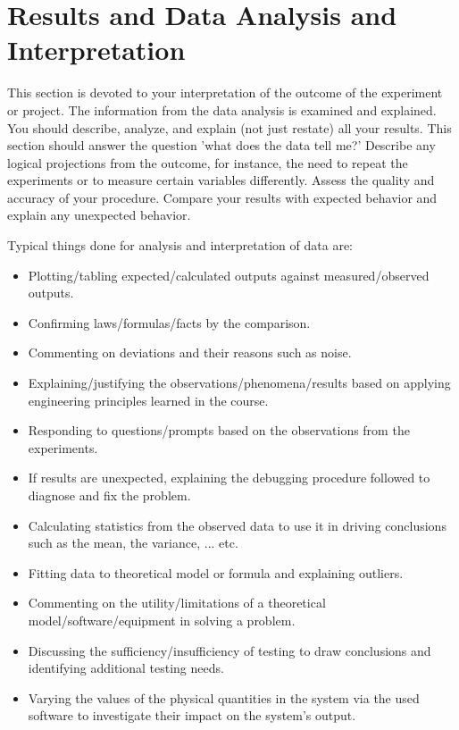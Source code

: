 \documentclass[journal]{IEEEtran}
\begin{document}
\section{Results and Data Analysis and Interpretation}
This section is devoted to your interpretation of the outcome of the experiment or project. The information from the data analysis is examined and explained. You should describe, analyze, and explain (not just restate) all your results. This section should answer the question 'what does the data tell me?' Describe any logical projections from the outcome, for instance, the need to repeat the experiments or to measure certain variables differently. Assess the quality and accuracy of your procedure. Compare your results with expected behavior and explain any unexpected behavior. 

Typical things done for analysis and interpretation of data are: 
\begin{itemize}
    \item Plotting/tabling expected/calculated outputs against measured/observed outputs.
    \item Confirming laws/formulas/facts by the comparison.
    \item Commenting on deviations and their reasons such as noise.
    \item Explaining/justifying the observations/phenomena/results based on applying engineering principles learned in the course.
    \item Responding to questions/prompts based on the observations from the experiments.
    \item If results are unexpected, explaining the debugging procedure followed to diagnose and fix the problem.
    \item Calculating statistics from the observed data to use it in driving conclusions such as the mean, the variance, ... etc.
    \item Fitting data to theoretical model or formula and explaining outliers.
    \item Commenting on the utility/limitations of a theoretical model/software/equipment in solving a problem.
    \item Discussing the sufficiency/insufficiency of testing to draw conclusions and identifying additional testing needs.
    \item Varying the values of the physical quantities in the system via the used software to investigate their impact on the system's output.
\end{itemize}
\end{document}

